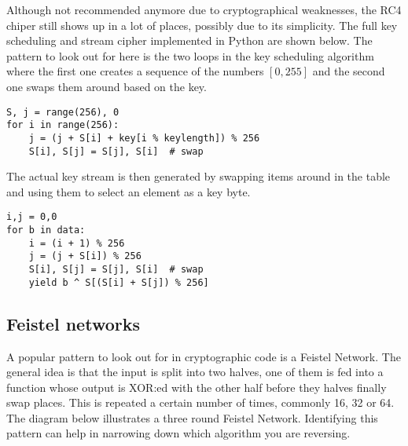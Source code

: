 \documentclass[twocolumn]{article}
\begin{document}
Although not recommended anymore due to cryptographical weaknesses, the RC4 chiper still shows up in a lot of places, possibly due to its simplicity. The full key scheduling and stream cipher implemented in Python are shown below. The pattern to look out for here is the two loops in the key scheduling algorithm where the first one creates a sequence of the numbers $[0,255]$ and the second one swaps them around based on the key.
\vspace*{-0.3\baselineskip}

\begin{verbatim}
S, j = range(256), 0
for i in range(256):
    j = (j + S[i] + key[i % keylength]) % 256
    S[i], S[j] = S[j], S[i]  # swap
\end{verbatim}

The actual key stream is then generated by swapping items around in the table and using them to select an element as a key byte.

\begin{verbatim}
i,j = 0,0
for b in data:
    i = (i + 1) % 256
    j = (j + S[i]) % 256
    S[i], S[j] = S[j], S[i]  # swap
    yield b ^ S[(S[i] + S[j]) % 256]
\end{verbatim}
\vspace*{-2\baselineskip}

\subsection*{Feistel networks}

A popular pattern to look out for in cryptographic code is a Feistel Network. The general idea is that the input is split into two halves, one of them is fed into a function whose output is XOR:ed with the other half before they halves finally swap places. This is repeated a certain number of times, commonly 16, 32 or 64. The diagram below illustrates a three round Feistel Network. Identifying this pattern can help in narrowing down which algorithm you are reversing.

\vspace*{-2\baselineskip}
\end{document}
